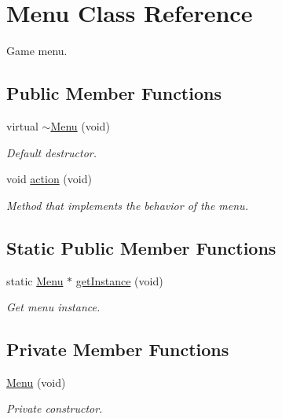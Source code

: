 \hypertarget{class_menu}{\section{Menu Class Reference}
\label{class_menu}
}


Game menu.  


\subsection*{Public Member Functions}
\begin{DoxyCompactItemize}
\item 
\hypertarget{class_menu_a73932d2ddab91e989102211f81c98c76}{virtual \hyperlink{class_menu_a73932d2ddab91e989102211f81c98c76}{$\sim$\-Menu} (void)}\label{class_menu_a73932d2ddab91e989102211f81c98c76}

\begin{DoxyCompactList}\small\item\em Default destructor. \end{DoxyCompactList}\item 
\hypertarget{class_menu_afbc7711526c62ad0d015bd8bf756b17e}{void \hyperlink{class_menu_afbc7711526c62ad0d015bd8bf756b17e}{action} (void)}\label{class_menu_afbc7711526c62ad0d015bd8bf756b17e}

\begin{DoxyCompactList}\small\item\em Method that implements the behavior of the menu. \end{DoxyCompactList}\end{DoxyCompactItemize}
\subsection*{Static Public Member Functions}
\begin{DoxyCompactItemize}
\item 
static \hyperlink{class_menu}{Menu} $\ast$ \hyperlink{class_menu_a93ed5d32c13c421c30bf6ef1291d7ec1}{get\-Instance} (void)
\begin{DoxyCompactList}\small\item\em Get menu instance. \end{DoxyCompactList}\end{DoxyCompactItemize}
\subsection*{Private Member Functions}
\begin{DoxyCompactItemize}
\item 
\hypertarget{class_menu_a0c1481a62f6b0bf63a506d2622f2244f}{\hyperlink{class_menu_a0c1481a62f6b0bf63a506d2622f2244f}{Menu} (void)}\label{class_menu_a0c1481a62f6b0bf63a506d2622f2244f}

\begin{DoxyCompactList}\small\item\em Private constructor. \end{DoxyCompactList}\end{DoxyCompactItemize}
